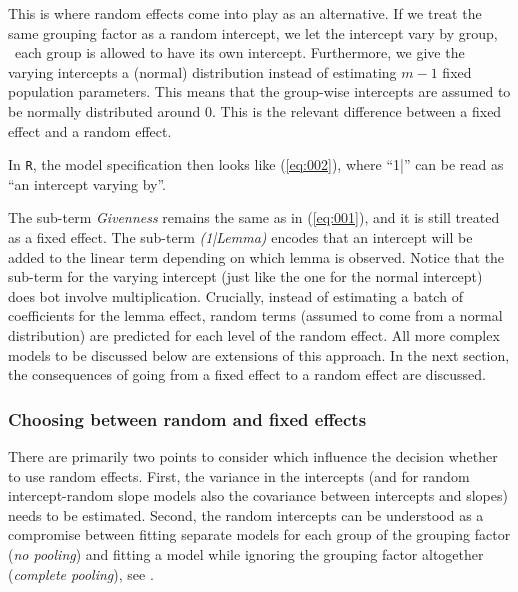 This is where random effects come into play as an alternative.
If we treat the same grouping factor as a random intercept, we let the intercept vary by group, \ie\ each group is allowed to have its own intercept.
Furthermore, we give the varying intercepts a (normal) distribution instead of estimating $m-1$ fixed population parameters.
This means that the group-wise intercepts are assumed to be normally distributed around $0$.
This is the relevant difference between a fixed effect and a random effect.

In \texttt{R}, the model specification then looks like (\ref{eq:002}), where ``1|'' can be read as ``an intercept varying by''.


The sub-term \textit{Givenness} remains the same as in (\ref{eq:001}), and it is still treated as a fixed effect.
The sub-term \textit{(1|Lemma)} encodes that an intercept will be added to the linear term depending on which lemma is observed.
Notice that the sub-term for the varying intercept (just like the one for the normal intercept) does bot involve multiplication.
Crucially, instead of estimating a batch of coefficients for the lemma effect, random terms (assumed to come from a normal distribution) are predicted for each level of the random effect.
All more complex models to be discussed below are extensions of this approach.
In the next section, the consequences of going from a fixed effect to a random effect are discussed.

\subsubsection{Choosing between random and fixed effects}
\label{sec:choosingbetweenrandomandfixedeffects}

There are primarily two points to consider which influence the decision whether to use random effects.
First, the variance in the intercepts (and for random intercept-random slope models also the covariance between intercepts and slopes) needs to be estimated.
Second, the random intercepts can be understood as a compromise between fitting separate models for each group of the grouping factor (\textit{no pooling}) and fitting a model while ignoring the grouping factor altogether (\textit{complete pooling}), see \citet[Ch.~12]{GelmanHill2006}.

